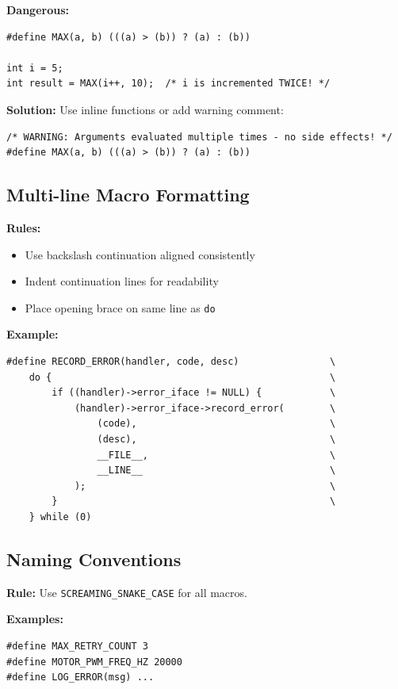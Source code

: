 \textbf{Dangerous:}
\begin{verbatim}
#define MAX(a, b) (((a) > (b)) ? (a) : (b))

int i = 5;
int result = MAX(i++, 10);  /* i is incremented TWICE! */
\end{verbatim}

\textbf{Solution:} Use inline functions or add warning comment:
\begin{verbatim}
/* WARNING: Arguments evaluated multiple times - no side effects! */
#define MAX(a, b) (((a) > (b)) ? (a) : (b))
\end{verbatim}

\subsection{Multi-line Macro Formatting}

\textbf{Rules:}
\begin{itemize}
    \item Use backslash continuation aligned consistently
    \item Indent continuation lines for readability
    \item Place opening brace on same line as \texttt{do}
\end{itemize}

\textbf{Example:}
\begin{verbatim}
#define RECORD_ERROR(handler, code, desc)                \
    do {                                                 \
        if ((handler)->error_iface != NULL) {            \
            (handler)->error_iface->record_error(        \
                (code),                                  \
                (desc),                                  \
                __FILE__,                                \
                __LINE__                                 \
            );                                           \
        }                                                \
    } while (0)
\end{verbatim}

\subsection{Naming Conventions}

\textbf{Rule:} Use \texttt{SCREAMING\_SNAKE\_CASE} for all macros.

\textbf{Examples:}
\begin{verbatim}
#define MAX_RETRY_COUNT 3
#define MOTOR_PWM_FREQ_HZ 20000
#define LOG_ERROR(msg) ...
\end{verbatim}

